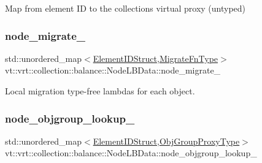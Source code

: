 Map from element ID to the collection\textquotesingle{}s virtual proxy (untyped) 

\mbox{\label{structvt_1_1vrt_1_1collection_1_1balance_1_1_node_l_b_data_a4e325cee830c96b4c4129538367fbf37}} 
\subsubsection{\texorpdfstring{node\+\_\+migrate\+\_\+}{node\_migrate\_}}
{\footnotesize\ttfamily std\+::unordered\+\_\+map$<$\hyperlink{namespacevt_1_1vrt_1_1collection_1_1balance_a9f5b53fafb270212279a4757d2c4cd28}{Element\+I\+D\+Struct},\hyperlink{structvt_1_1vrt_1_1collection_1_1balance_1_1_node_l_b_data_a200140e389d08dc8d74db16589e736bc}{Migrate\+Fn\+Type}$>$ vt\+::vrt\+::collection\+::balance\+::\+Node\+L\+B\+Data\+::node\+\_\+migrate\+\_\+\hspace{0.3cm}{\ttfamily [private]}}



Local migration type-\/free lambdas for each object. 

\mbox{\label{structvt_1_1vrt_1_1collection_1_1balance_1_1_node_l_b_data_a168baa5b6f532b6f37431ef4e7f7e48e}} 
\subsubsection{\texorpdfstring{node\+\_\+objgroup\+\_\+lookup\+\_\+}{node\_objgroup\_lookup\_}}
{\footnotesize\ttfamily std\+::unordered\+\_\+map$<$\hyperlink{namespacevt_1_1vrt_1_1collection_1_1balance_a9f5b53fafb270212279a4757d2c4cd28}{Element\+I\+D\+Struct},\hyperlink{namespacevt_ad7cae989df485fccca57f0792a880a8e}{Obj\+Group\+Proxy\+Type}$>$ vt\+::vrt\+::collection\+::balance\+::\+Node\+L\+B\+Data\+::node\+\_\+objgroup\+\_\+lookup\+\_\+\hspace{0.3cm}{\ttfamily [private]}}



